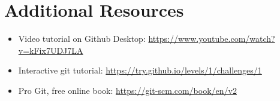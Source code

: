 \documentclass[12pt]{scrartcl}
\begin{document}
\section*{Additional Resources}
\label{section:additionalResources}

\begin{itemize} 
  \item Video tutorial on Github Desktop: \url{https://www.youtube.com/watch?v=kFix7UDJ7LA}
  \item Interactive git tutorial: \url{https://try.github.io/levels/1/challenges/1}
  \item Pro Git, free online book: \url{https://git-scm.com/book/en/v2}
\end{itemize}


  
\end{document}
